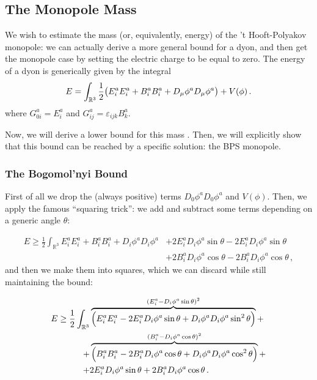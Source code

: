 \documentclass[main.tex]{subfiles}
\begin{document}
\subsection{The Monopole Mass}

We wish to estimate the mass (or, equivalently, energy) of the 't Hooft-Polyakov monopole: we can actually derive a more general bound for a dyon, and then get the monopole case by setting the electric charge to be equal to zero.
The energy of a dyon is generically given by the integral
%
\begin{equation} \label{eq:monopole-mass}
  E = \int_{\mathbb{R}^3}
  \frac{1}{2} \qty(E_i^a E_i^a + B_i^a B_i^a + D_\mu \phi^a D_\mu \phi^a) + V(\phi)\,.
\end{equation}
%
where \(G_{0i}^a = E_i^a\) and \(G_{ij}^a = \varepsilon _{ijk} B_k^a\).

Now, we will derive a lower bound for this mass \cite{Bogomolny}. Then, we will explicitly show that this bound can be reached by a specific solution: the BPS monopole.

\subsubsection{The Bogomol'nyi Bound}

First of all we drop the (always positive) terms \(D_0 \phi^a D_0 \phi^a\) and \(V(\phi)\).
Then, we apply the famous ``squaring trick'': we add and subtract some terms depending on a generic angle \(\theta\):

\begin{equation}
\begin{split}
    E \geq \frac{1}{2}  \int_{\mathbb R^3}   E_i^a E_i^a + B_i^a B_i^a + D_i \phi^a D_i \phi^a &+2 E_i^a D_i \phi^a \sin \theta - 2E_i^a D_i \phi^a \sin \theta \\
  &+2 B_i^a D_i \phi^a \cos \theta - 2 B_i^a D_i \phi^a \cos \theta \,,
\end{split}
\end{equation}
%
and then we make them into squares, which we can discard while still maintaining the bound:
%

\begin{equation}
\begin{split}
    E \geq  \frac{1}{2} \int_{\mathbb R^3}
    &\overbrace{\qty(E_i^a E_i^a - 2 E_i^a D_i\phi^a \sin\theta + D_i\phi^a D_i\phi^a \sin^2\theta)}^{(E_i^a - D_i\phi^a \sin\theta)^2} + \\
    + &\overbrace{\qty( B_i^a B_i^a - 2 B_i^a D_i\phi^a \cos\theta + D_i\phi^a D_i\phi^a \cos^2\theta)}^{(B_i^a - D_i\phi^a \cos\theta)^2} +  \\
    +&2 E_i^a D_i \phi^a \sin \theta+2 B_i^a D_i \phi^a \cos \theta \,.
\end{split}
\end{equation}
\end{document}
